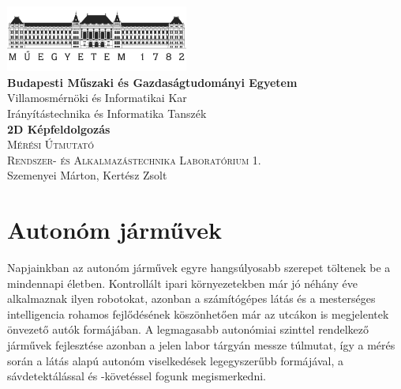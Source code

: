 \documentclass[12pt,a4paper,oneside]{report}             %
\author{\vikauthor}
\title{\viktitle}
\newcommand{\vikdept}{Irányítástechnika és Informatika Tanszék}
\newcommand{\viksubtitle}{Mérési Útmutató}
\newcommand{\viktitle}{2D Képfeldolgozás}
\newcommand{\vikdoktipus}{Rendszer- és Alkalmazástechnika Laboratórium 1.}
\newcommand{\vikauthor}{Szemenyei Márton, Kertész Zsolt}
\newcommand{\viktitle}{M8 – Sávkövetés}
\newcommand{\vikdoktipus}{Irányítástechnika és Képfeldolgozás Laboratórium 1.}
\newcommand{\vikauthor}{Szemenyei Márton, Reizinger Patrik}
\newcommand{\hsp}{\hspace{20pt}}
\begin{document}
\onehalfspacing

\begin{titlepage}
\begin{center}
\includegraphics[width=60mm,keepaspectratio]{images/logo.png}\\
\vspace{0.3cm}
\textbf{Budapesti Műszaki és Gazdaságtudományi Egyetem}\\
\textmd{Villamosmérnöki és Informatikai Kar}\\
\textmd{\vikdept}\\[5cm]

\vspace{0.4cm}
{\huge \bfseries \viktitle}\\[2cm]
\textsc{\Large \viksubtitle}\\[1cm]
\textsc{\Large \vikdoktipus}\\[6cm]

\vfill
{\large \vikauthor}
\end{center}
\end{titlepage}


\singlespacing
\tableofcontents\thispagestyle{fancy}
\titleformat{\chapter}[hang]{\Huge\bfseries}{\thechapter\hsp}{0pt}{\Huge\bfseries}
\onehalfspacing

\chapter{Autonóm járművek}

Napjainkban az autonóm járművek egyre hangsúlyosabb szerepet töltenek be a mindennapi életben. Kontrollált ipari környezetekben már jó néhány éve alkalmaznak ilyen robotokat, azonban a számítógépes látás és a mesterséges intelligencia rohamos fejlődésének köszönhetően már az utcákon is megjelentek önvezető autók formájában. A legmagasabb autonómiai szinttel rendelkező járművek fejlesztése azonban a jelen labor tárgyán messze túlmutat, így a mérés során a látás alapú autonóm viselkedések legegyszerűbb formájával, a sávdetektálással és -követéssel fogunk megismerkedni.
\end{document}
